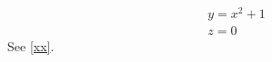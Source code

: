 \documentclass{article}
\begin{document}
 
\begin{gather}
  y = x^2 + 1 \label{xx}\\
  z = 0
\end{gather}
See \eqref{xx}.
\end{document}
